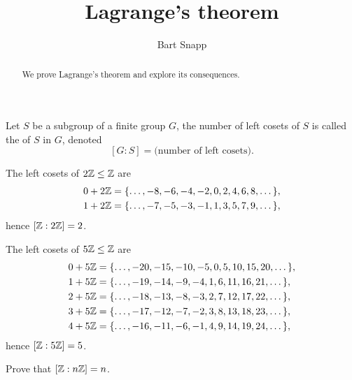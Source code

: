 \documentclass{ximera}
\author{Bart Snapp}
\title{Lagrange's theorem}
\begin{document}
\begin{abstract}
  We prove Lagrange's theorem and explore its consequences.
\end{abstract}
\maketitle

\begin{definition}
  Let $S$ be a subgroup of a finite group $G$, the number of left
  cosets of $S$ is called the  of $S$ in $G$, denoted
  \[
  [G:S] = \text{(number of left cosets)}.
  \]
\end{definition}



\begin{example}
  The left cosets of $2\mathbb Z\leq \mathbb Z$ are
  \begin{align*}
    0+2\mathbb Z &= \{\dots, -8,-6,-4,-2,0,2,4,6,8,\dots\},\\
    1+2\mathbb Z &= \{\dots, -7,-5,-3,-1,1,3,5,7,9,\dots\},
  \end{align*}
  hence $[\mathbb Z:2\mathbb Z] = 2$.
\end{example}

\begin{example}
  The left cosets of $5\mathbb Z\leq \mathbb Z$ are
  \begin{align*}
    0+5\mathbb Z &= \{\dots, -20,-15,-10,-5,0,5,10,15,20,\dots\},\\
    1+5\mathbb Z &= \{\dots, -19,-14,-9 ,-4,1,6,11,16,21,\dots\},\\
    2+5\mathbb Z &= \{\dots, -18,-13,-8 ,-3,2,7,12,17,22,\dots\},\\
    3+5\mathbb Z &= \{\dots, -17,-12,-7 ,-2,3,8,13,18,23,\dots\},\\
    4+5\mathbb Z &= \{\dots, -16,-11,-6 ,-1,4,9,14,19,24,\dots\},
  \end{align*}
  hence $[\mathbb Z:5\mathbb Z] = 5$.
\end{example}

\begin{exercise}
  Prove that $[\mathbb Z:n\mathbb Z]= n$.
\end{exercise}
\end{document}
